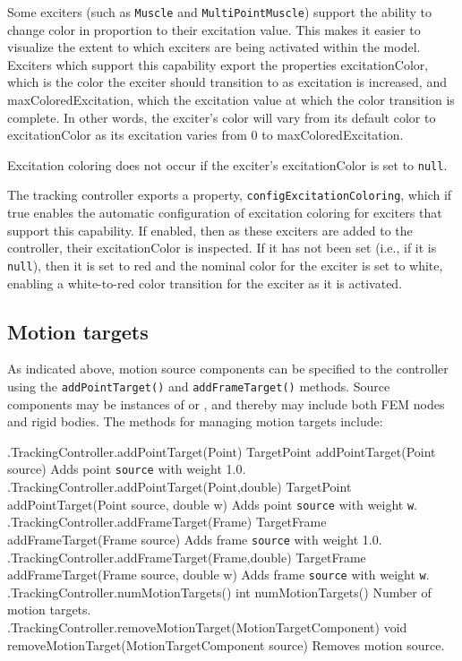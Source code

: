 Some exciters (such as {\tt Muscle} and {\tt MultiPointMuscle}) support the
ability to change color in proportion to their excitation value. This makes it
easier to visualize the extent to which exciters are being activated within the
model. Exciters which support this capability export the properties {\sf
excitationColor}, which is the color the exciter should transition to as
excitation is increased, and {\sf maxColoredExcitation}, which the excitation
value at which the color transition is complete.  In other words, the exciter's
color will vary from its default color to {\sf excitationColor} as its excitation
varies from 0 to {\sf maxColoredExcitation}.

Excitation coloring does not occur if the exciter's {\sf excitationColor} is
set to {\tt null}.

The tracking controller exports a property, {\tt configExcitationColoring},
which if true enables the automatic configuration of excitation coloring for
exciters that support this capability. If enabled, then as these exciters are
added to the controller, their {\sf excitationColor} is inspected.  If it has
not been set (i.e., if it is {\tt null}), then it is set to red and the nominal
color for the exciter is set to white, enabling a white-to-red color transition
for the exciter as it is activated.

\subsection{Motion targets}

As indicated above, motion source components can be specified to the controller
using the {\tt addPointTarget()} and {\tt addFrameTarget()} methods. Source
components may be instances of 
or , and thereby may include both FEM nodes and rigid
bodies. The methods for managing motion targets include:
%
\begin{methodtable}{0.58}{0.42}
\midline
%
\methodentry
{\inverse.TrackingController.addPointTarget(Point)}%
{TargetPoint addPointTarget(Point source)}%
{Adds point {\tt source} with weight 1.0.}%
%
\methodentry
{\inverse.TrackingController.addPointTarget(Point,double)}%
{TargetPoint addPointTarget(Point source, double w)}%
{Adds point {\tt source} with weight {\tt w}.}%
%
\methodentry
{\inverse.TrackingController.addFrameTarget(Frame)}%
{TargetFrame addFrameTarget(Frame source)}%
{Adds frame {\tt source} with weight 1.0.}%
%
\methodentry
{\inverse.TrackingController.addFrameTarget(Frame,double)}%
{TargetFrame addFrameTarget(Frame source, double w)}%
{Adds frame {\tt source} with weight {\tt w}.}%
%
\methodspace{0.5em}
%
\methodentry
{\inverse.TrackingController.numMotionTargets()}%
{int numMotionTargets()}%
{Number of motion targets.}%
%
\methodentry
{\inverse.TrackingController.removeMotionTarget(MotionTargetComponent)}%
{void removeMotionTarget(MotionTargetComponent source)}%
{Removes motion source.}%
%
\midline
\end{methodtable}
%

